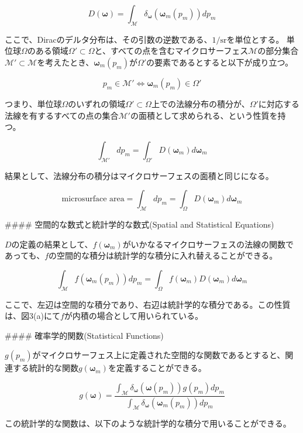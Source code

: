 \[
D(\boldsymbol{\omega}) = \int_{\mathcal M} \delta_\boldsymbol{\omega}(\boldsymbol{\omega}_m(p_m)) d p_m
\label{eq:2} \tag{2}
\]

ここで、Diracのデルタ分布は、その引数の逆数である、$1/\text{sr}$を単位とする。
単位球$\Omega$のある領域$\Omega' \subset \Omega$と、すべての点を含むマイクロサーフェス$\mathcal M$の部分集合$\mathcal M' \subset \mathcal M$を考えたとき、$\boldsymbol{\omega}_m(p_m)$が$\Omega'$の要素であるとすると以下が成り立つ。

\[
p_m \in \mathcal{M}' \iff \boldsymbol{\omega}_m(p_m) \in \Omega'
\label{eq:3} \tag{3}
\]

つまり、単位球$\Omega$のいずれの領域$\Omega' \subset \Omega$上での法線分布の積分が、$\Omega'$に対応する法線を有するすべての点の集合$\mathcal M'$の面積として求められる、という性質を持つ。

\[
\int_{\mathcal M'} dp_m = \int_{\Omega'} D(\boldsymbol{\omega}_m)d\boldsymbol{\omega}_m
\label{eq:4} \tag{4}
\]

結果として、法線分布の積分はマイクロサーフェスの面積と同じになる。

\[
\text{microsurface area} = \int_{\mathcal M} dp_m = \int_{\Omega} D(\boldsymbol{\omega}_m)d\boldsymbol{\omega}_m
\label{eq:5} \tag{5}
\]

#### 空間的な数式と統計学的な数式(Spatial and Statistical Equations)

$D$の定義の結果として、$f(\boldsymbol{\omega}_m)$がいかなるマイクロサーフェスの法線の関数であっても、$f$の空間的な積分は統計学的な積分に入れ替えることができる。

\[
\int_{\mathcal M} f(\boldsymbol{\omega}_m(p_m))dp_m = \int_{\Omega}f(\boldsymbol{\omega}_m) D(\boldsymbol{\omega}_m)d\boldsymbol{\omega}_m
\label{eq:6} \tag{6}
\]

ここで、左辺は空間的な積分であり、右辺は統計学的な積分である。この性質は、図3(a)にて$f$が内積の場合として用いられている。

#### 確率学的関数(Statistical Functions)

$g(p_m)$がマイクロサーフェス上に定義された空間的な関数であるとすると、関連する統計的な関数$g(\boldsymbol{\omega}_m)$を定義することができる。

\[
g(\boldsymbol{\omega}) = \frac{\int_{\mathcal M} \delta_\boldsymbol{\omega}(\boldsymbol{\omega}(p_m)) g(p_m) dp_m}{\int_{\mathcal M} \delta_\boldsymbol{\omega}(\boldsymbol{\omega}_m(p_m)) dp_m}
\label{eq:7} \tag{7}
\]

この統計学的な関数は、以下のような統計学的な積分で用いることができる。

